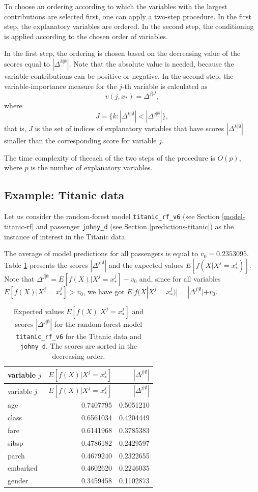 \documentclass[12pt,]{krantz}
\begin{document}
To choose an ordering according to which the variables with the largest contributions are selected first, one can apply a two-step procedure. In the first step, the explanatory variables are ordered. In the second step, the conditioning is applied according to the chosen order of variables.

In the first step, the ordering is chosen based on the decreasing value of the scores equal to \(|\Delta^{k|\emptyset}|\). Note that the absolute value is needed, because the variable contributions can be positive or negative. In the second step, the variable-importance measure for the \(j\)-th variable is calculated as
\[
v(j, x_*) = \Delta ^{j|J},
\]
where
\[
J = \{k: |\Delta^{k|\emptyset}| < |\Delta^{j|\emptyset}|\},
\]
that is, \(J\) is the set of indices of explanatory variables that have scores \(|\Delta^{k|\emptyset}|\) smaller than the corresponding score for variable \(j\).

The time complexity of theeach of the two steps of the procedure is \(O(p)\), where \(p\) is the number of explanatory variables.

\hypertarget{BDExample}{%
\subsection{Example: Titanic data}\label{BDExample}}

Let us consider the random-forest model \texttt{titanic\_rf\_v6} (see Section \ref{model-titanic-rf} and passenger \texttt{johny\_d} (see Section \ref{predictions-titanic}) as the instance of interest in the Titanic data.

The average of model predictions for all passengers is equal to \(v_0 = 0.2353095\). Table \ref{tab:titanicBreakDownDeltas} presents the scores \(|\Delta^{j|\emptyset}|\) and the expected values \(E[f(X | X^j = x^j_*)]\). Note that \(\Delta^{j|\emptyset}=E[f(X) | X^j = x^j_*]-v_0\) and, since for all variables \(E[f(X) | X^j = x^j_*]>v_0\), we have got \(E[f(X | X^j = x^j_*)]=|\Delta^{j|\emptyset}|+v_0\).

\begin{longtable}[]{@{}lrr@{}}
\caption{\label{tab:titanicBreakDownDeltas} Expected values \(E[f(X) | X^j = x^j_*]\) and scores \(|\Delta^{j|\emptyset}|\) for the random-forest model \texttt{titanic\_rf\_v6} for the Titanic data and \texttt{johny\_d}. The scores are sorted in the decreasing order.}\tabularnewline
\toprule
variable \(j\) & \(E[f(X) | X^j = x^j_*]\) & \(|\Delta^{j|\emptyset}|\)\tabularnewline
\midrule
\endfirsthead
\toprule
variable \(j\) & \(E[f(X) | X^j = x^j_*]\) & \(|\Delta^{j|\emptyset}|\)\tabularnewline
\midrule
\endhead
age & 0.7407795 & 0.5051210\tabularnewline
class & 0.6561034 & 0.4204449\tabularnewline
fare & 0.6141968 & 0.3785383\tabularnewline
sibsp & 0.4786182 & 0.2429597\tabularnewline
parch & 0.4679240 & 0.2322655\tabularnewline
embarked & 0.4602620 & 0.2246035\tabularnewline
gender & 0.3459458 & 0.1102873\tabularnewline
\bottomrule
\end{longtable}
\end{document}
